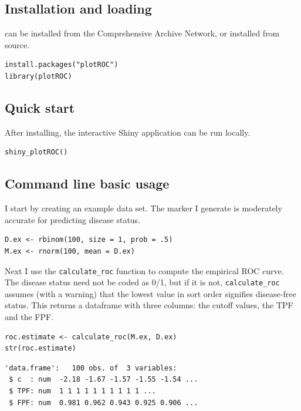 \documentclass[article]{jss}
\begin{document}
\subsection{Installation and loading}\label{installation-and-loading}

 can be installed from the Comprehensive 
Archive Network, or installed from source.

\begin{verbatim}
install.packages("plotROC")
library(plotROC)
\end{verbatim}

\subsection{Quick start}\label{quick-start}

After installing, the interactive Shiny application can be run locally.

\begin{verbatim}
shiny_plotROC()
\end{verbatim}

\subsection{Command line basic usage}\label{command-line-basic-usage}

I start by creating an example data set. The marker I generate is
moderately accurate for predicting disease status.

\begin{verbatim}
D.ex <- rbinom(100, size = 1, prob = .5)
M.ex <- rnorm(100, mean = D.ex)
\end{verbatim}

Next I use the \texttt{calculate\_roc} function to compute the empirical
ROC curve. The disease status need not be coded as 0/1, but if it is
not, \texttt{calculate\_roc} assumes (with a warning) that the lowest
value in sort order signifies disease-free status. This returns a
dataframe with three columns: the cutoff values, the TPF and the FPF.

\begin{verbatim}
roc.estimate <- calculate_roc(M.ex, D.ex)
str(roc.estimate)
\end{verbatim}

\begin{verbatim}
'data.frame':   100 obs. of  3 variables:
 $ c  : num  -2.18 -1.67 -1.57 -1.55 -1.54 ...
 $ TPF: num  1 1 1 1 1 1 1 1 1 1 ...
 $ FPF: num  0.981 0.962 0.943 0.925 0.906 ...
\end{verbatim}
\end{document}
